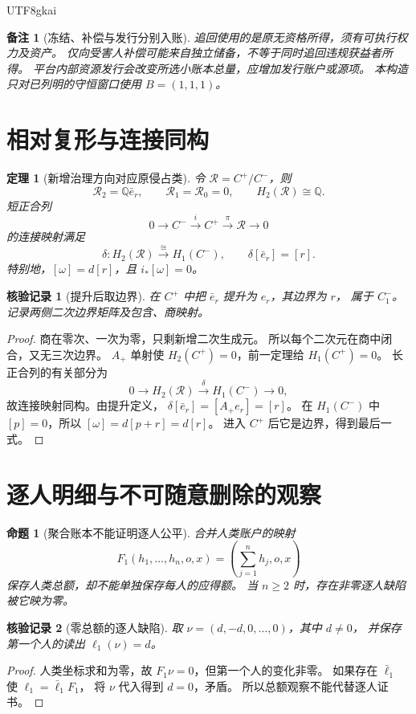 \documentclass[12pt,a4paper,openany]{report}
\newtheorem{theorem}{定理}[chapter]
\newtheorem{proposition}{命题}[chapter]
\newtheorem{remark}{备注}[chapter]
\newtheorem{Certificate}{核验记录}[chapter]
\newcommand{\QQ}{\mathbb Q}
\begin{document}
\begin{CJK*}{UTF8}{gkai}
\begin{remark}[冻结、补偿与发行分别入账]
追回使用的是原无资格所得，须有可执行权力及资产。
仅向受害人补偿可能来自独立储备，不等于同时追回违规获益者所得。
平台内部资源发行会改变所选小账本总量，应增加发行账户或源项。
本构造只对已列明的守恒窗口使用 \(B=(1,1,1)\)。
\end{remark}

\section{相对复形与连接同构}
\begin{theorem}[新增治理方向对应原侵占类]
\label{thm:relative}
令 \(\mathcal R=C^+/C^-\)，则
\[
\mathcal R_2=\QQ\bar e_r,\qquad
\mathcal R_1=\mathcal R_0=0,\qquad
H_2(\mathcal R)\cong\QQ.
\]
短正合列
\[
0\longrightarrow C^-\xrightarrow{i}C^+
\xrightarrow{\pi}\mathcal R\longrightarrow0
\]
的连接映射满足
\[
\boxed{\delta:H_2(\mathcal R)\xrightarrow{\cong}H_1(C^-),\qquad
\delta[\bar e_r]=[r].}
\]
特别地，\([\omega]=d[r]\)，且 \(i_*[\omega]=0\)。
\end{theorem}
\begin{Certificate}[提升后取边界]
在 \(C^+\) 中把 \(\bar e_r\) 提升为 \(e_r\)，其边界为 \(r\)，
属于 \(C^-_1\)。记录两侧二次边界矩阵及包含、商映射。
\end{Certificate}
\begin{proof}
商在零次、一次为零，只剩新增二次生成元。
所以每个二次元在商中闭合，又无三次边界。
\(A_+\) 单射使 \(H_2(C^+)=0\)，前一定理给 \(H_1(C^+)=0\)。
长正合列的有关部分为
\[
0\longrightarrow H_2(\mathcal R)
\xrightarrow{\delta}H_1(C^-)\longrightarrow0,
\]
故连接映射同构。由提升定义，
\(\delta[\bar e_r]=[A_+e_r]=[r]\)。
在 \(H_1(C^-)\) 中 \([p]=0\)，所以
\([\omega]=d[p+r]=d[r]\)。
进入 \(C^+\) 后它是边界，得到最后一式。
\end{proof}

\section{逐人明细与不可随意删除的观察}
\begin{proposition}[聚合账本不能证明逐人公平]
\label{prop:aggregation}
合并人类账户的映射
\[
F_1(h_1,\ldots,h_n,o,x)=
\left(\sum_{j=1}^nh_j,o,x\right)
\]
保存人类总额，却不能单独保存每人的应得额。
当 \(n\ge2\) 时，存在非零逐人缺陷被它映为零。
\end{proposition}
\begin{Certificate}[零总额的逐人缺陷]
取 \(\nu=(d,-d,0,\ldots,0)\)，其中 \(d\ne0\)，
并保存第一个人的读出 \(\ell_1(\nu)=d\)。
\end{Certificate}
\begin{proof}
人类坐标求和为零，故 \(F_1\nu=0\)，但第一个人的变化非零。
如果存在 \(\bar\ell_1\) 使 \(\ell_1=\bar\ell_1F_1\)，
将 \(\nu\) 代入得到 \(d=0\)，矛盾。
所以总额观察不能代替逐人证书。
\end{proof}


\end{CJK*}
\end{document}
